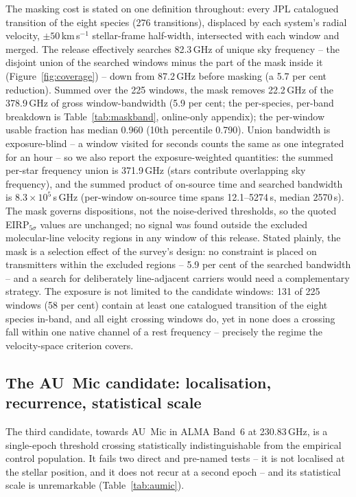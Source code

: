 \documentclass{openjournal}
\begin{document}
The masking cost is stated on one definition throughout: every JPL
catalogued transition of the eight species (276 transitions),
displaced by each system's radial velocity, $\pm50$\,km\,s$^{-1}$
stellar-frame half-width, intersected with each window and merged.
The release effectively searches 82.3\,GHz of unique sky frequency --
the disjoint union of the searched windows minus the part of the mask
inside it (Figure~\ref{fig:coverage}) -- down from 87.2\,GHz before
masking (a 5.7 per cent reduction). Summed over the 225 windows, the
mask removes 22.2\,GHz of the 378.9\,GHz of gross window-bandwidth
(5.9 per cent; the per-species, per-band breakdown is
Table~\ref{tab:maskband}, online-only appendix); the per-window
usable fraction has median 0.960 (10th percentile 0.790). Union bandwidth is exposure-blind -- a window
visited for seconds counts the same as one integrated for an hour --
so we also report the exposure-weighted quantities: the summed
per-star frequency union is 371.9\,GHz (stars contribute overlapping
sky frequency), and the summed product of on-source time and searched
bandwidth is $8.3\times10^{5}$\,s\,GHz (per-window on-source time
spans 12.1--5274\,s, median 2570\,s). The mask governs dispositions,
not the noise-derived thresholds, so the quoted EIRP$_{5\sigma}$
values are unchanged; no signal was found outside the excluded
molecular-line velocity regions in any window of this release.
Stated plainly, the mask is a selection effect of the survey's
design: no constraint is placed on transmitters within the excluded
regions -- 5.9 per cent of the searched bandwidth -- and a search for
deliberately line-adjacent carriers would need a complementary
strategy. The exposure is not limited to the candidate windows: 131 of
225 windows (58 per cent) contain at least one catalogued transition
of the eight species in-band, and all eight crossing windows do, yet
in none does a crossing fall within one native channel of a rest
frequency -- precisely the regime the velocity-space criterion
covers.

\subsection{The AU~Mic candidate: localisation, recurrence, statistical scale}
\label{sec:aumic}

The third candidate, towards AU~Mic in ALMA Band~6 at 230.83\,GHz, is
a single-epoch threshold crossing statistically indistinguishable from
the empirical control population. It fails two direct and pre-named
tests -- it is not localised at the stellar position, and it does not
recur at a second epoch -- and its statistical scale is unremarkable
(Table~\ref{tab:aumic}).
\end{document}
